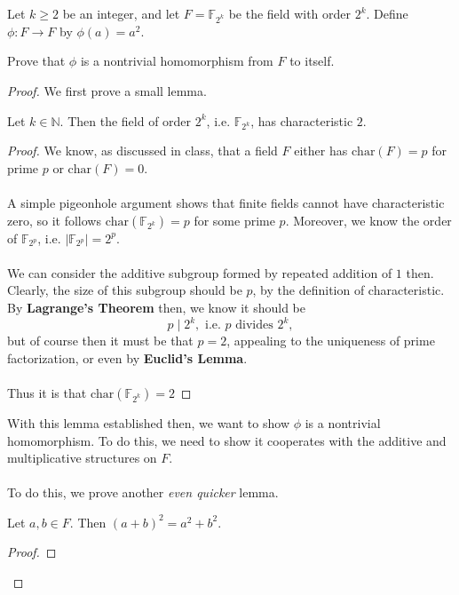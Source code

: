 \documentclass[12pt]{article}
\newenvironment{ex}[2][Exercise]{\begin{trivlist}
\item[\hskip \labelsep {\bfseries #1}\hskip \labelsep {\bfseries #2.}]}{\end{trivlist}}
\newenvironment{lemma}[2][Lemma]{\begin{trivlist}
\item[\hskip \labelsep {\bfseries #1}\hskip \labelsep {\bfseries #2.}]}{\end{trivlist}}
\begin{document}
\begin{ex}{5}
    Let $k \geq 2$ be an integer, and let $F = \mathbb{F}_{2^k}$ be the field with order $2^k$. Define $\phi : F \rightarrow F$ by $\phi(a) = a^2$. 
    \begin{enumerate}[label=(\alph*)]
        \item Prove that $\phi$ is a nontrivial homomorphism from $F$ to itself. 
        \begin{proof}
            We first prove a small lemma. 
            \begin{lemma}{2}
                Let $k \in \mathbb{N}$. Then the field of order $2^k$, i.e. $\mathbb{F}_{2^k}$, has characteristic $2$.
                \begin{proof}
                    We know, as discussed in class, that a field $F$ either has $\text{char}(F) = p$ for prime $p$ or $\text{char}(F) = 0$. \\ \\
                    A simple pigeonhole argument shows that finite fields cannot have characteristic zero, so it follows $\text{char}(\mathbb{F}_{2^k}) = p$ for some prime $p$. Moreover, we know the order of $\mathbb{F}_{2^p}$, i.e. $|\mathbb{F}_{2^p}| = 2^p$.  \\ \\
                    We can consider the additive subgroup formed by repeated addition of $1$ then. Clearly, the size of this subgroup should be $p$, by the definition of characteristic. By \textbf{Lagrange's Theorem} then, we know it should be 
                    $$p \; | \; 2^k, \text{ i.e. } p \text{ divides } 2^k,$$
                    but of course then it must be that $p = 2$, appealing to the uniqueness of prime factorization, or even by \textbf{Euclid's Lemma}. \\ \\
                    Thus it is that $\text{char}(\mathbb{F}_{2^k}) = 2$
                \end{proof}
            \end{lemma}
            With this lemma established then, we want to show $\phi$ is a nontrivial homomorphism. To do this, we need to show it cooperates with the additive and multiplicative structures on $F$. \\ \\
            To do this, we prove another \textit{even quicker} lemma.
            \begin{lemma}{3}
                Let $a, b \in F$. Then $(a + b)^2 = a^2 + b^2$.
                \begin{proof}

\end{proof}
\end{lemma}
\end{proof}
\end{enumerate}
\end{ex}
\end{document}
